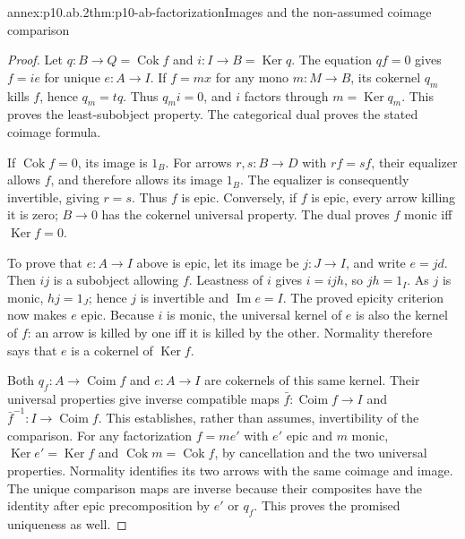 \begin{annexitem}{annex:p10.ab.2}{thm:p10-ab-factorization}{Images and the non-assumed coimage comparison}
\begin{proof}
Let \(q:B\to Q=\operatorname{Cok}f\) and
\(i:I\to B=\operatorname{Ker}q\). The equation \(qf=0\) gives
\(f=ie\) for unique \(e:A\to I\). If \(f=mx\) for any mono
\(m:M\to B\), its cokernel \(q_m\) kills \(f\), hence
\(q_m=tq\). Thus \(q_m i=0\), and \(i\) factors through
\(m=\operatorname{Ker}q_m\). This proves the least-subobject property.
The categorical dual proves the stated coimage formula.

If \(\operatorname{Cok}f=0\), its image is \(1_B\). For arrows
\(r,s:B\to D\) with \(rf=sf\), their equalizer allows \(f\),
and therefore allows its image \(1_B\). The equalizer is consequently
invertible, giving \(r=s\). Thus \(f\) is epic. Conversely, if
\(f\) is epic, every arrow killing it is zero; \(B\to0\) has the
cokernel universal property. The dual proves
\(f\) monic iff \(\operatorname{Ker}f=0\).

To prove that \(e:A\to I\) above is epic, let its image be
\(j:J\to I\), and write \(e=jd\). Then \(ij\) is a subobject
allowing \(f\). Leastness of \(i\) gives \(i=ijh\), so
\(jh=1_I\). As \(j\) is monic, \(hj=1_J\); hence \(j\) is
invertible and \(\operatorname{Im}e=I\). The proved epicity criterion
now makes \(e\) epic. Because \(i\) is monic, the universal kernel
of \(e\) is also the kernel of \(f\): an arrow is killed by one
iff it is killed by the other. Normality therefore says that \(e\)
is a cokernel of \(\operatorname{Ker}f\).

Both \(q_f:A\to\operatorname{Coim}f\) and \(e:A\to I\) are
cokernels of this same kernel. Their universal properties give inverse
compatible maps \(\bar f:\operatorname{Coim}f\to I\) and
\(\bar f^{-1}:I\to\operatorname{Coim}f\). This establishes, rather
than assumes, invertibility of the comparison.
For any factorization \(f=me'\) with \(e'\) epic and \(m\) monic,
\(\operatorname{Ker}e'=\operatorname{Ker}f\) and
\(\operatorname{Cok}m=\operatorname{Cok}f\), by cancellation and the
two universal properties. Normality identifies its two arrows with the
same coimage and image. The unique comparison maps are inverse because
their composites have the identity after epic precomposition by \(e'\)
or \(q_f\). This proves the promised uniqueness as well.
\end{proof}
\end{annexitem}

